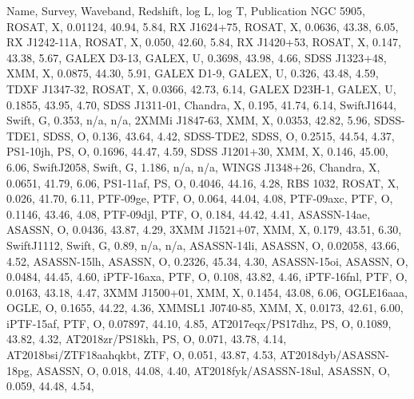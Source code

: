 Name, Survey, Waveband, Redshift, log L, log T, Publication
NGC 5905, ROSAT, X, 0.01124, 40.94, 5.84, \cite{Bade1996}
RX J1624+75, ROSAT, X, 0.0636, 43.38, 6.05, \cite{Grupe1999}
RX J1242-11A, ROSAT, X, 0.050, 42.60, 5.84, \cite{Komossa1999}
RX J1420+53, ROSAT, X, 0.147, 43.38, 5.67, \cite{Greiner2000}
GALEX D3-13, GALEX, U, 0.3698, 43.98, 4.66, \cite{Gezari2006}
SDSS J1323+48, XMM, X, 0.0875, 44.30, 5.91, \cite{Esquej2007}
GALEX D1-9, GALEX, U, 0.326, 43.48, 4.59, \cite{Gezari2008}
TDXF J1347-32, ROSAT, X, 0.0366, 42.73, 6.14, \cite{Cappelluti2009}
GALEX D23H-1, GALEX, U, 0.1855, 43.95, 4.70, \cite{Gezari2009}
SDSS J1311-01, Chandra, X, 0.195, 41.74, 6.14, \cite{Maksym2010}
SwiftJ1644, Swift, G, 0.353,   n/a, n/a, \cite{Bloom2011}
2XMMi J1847-63, XMM, X, 0.0353, 42.82, 5.96, \cite{Lin2011}
SDSS-TDE1, SDSS, O, 0.136, 43.64, 4.42, \cite{vanVelzen2011}
SDSS-TDE2, SDSS, O,      0.2515, 44.54, 4.37, \cite{vanVelzen2011}
PS1-10jh, PS, O,      0.1696, 44.47, 4.59, \cite{Gezari2012}
SDSS J1201+30, XMM, X, 0.146, 45.00, 6.06, \cite{Saxton2012}
SwiftJ2058, Swift, G, 1.186,   n/a, n/a, \cite{Cenko2012}
WINGS J1348+26, Chandra, X, 0.0651, 41.79, 6.06, \cite{Maksym2013}
PS1-11af, PS, O,      0.4046, 44.16, 4.28, \cite{Chornock2014}
RBS 1032, ROSAT, X, 0.026, 41.70, 6.11, \cite{Maksym2014}
PTF-09ge, PTF, O,     0.064, 44.04, 4.08, \cite{Arcavi2014}
PTF-09axc, PTF, O,      0.1146, 43.46, 4.08, \cite{Arcavi2014}
PTF-09djl, PTF, O,      0.184, 44.42, 4.41, \cite{Arcavi2014}
ASASSN-14ae, ASASSN, O,     0.0436, 43.87, 4.29, \cite{Holoien2014}
3XMM J1521+07, XMM, X, 0.179, 43.51, 6.30, \cite{Lin2015}
SwiftJ1112, Swift, G, 0.89,   n/a, n/a, \cite{Brown2015}
ASASSN-14li, ASASSN, O,     0.02058, 43.66, 4.52, \cite{Holoien2016}
ASASSN-15lh, ASASSN, O, 0.2326, 45.34, 4.30, \cite{Dong2016}
ASASSN-15oi, ASASSN, O,       0.0484, 44.45, 4.60, \cite{Holoien2016}
iPTF-16axa, PTF, O,      0.108, 43.82, 4.46, \cite{Hung2017}
iPTF-16fnl, PTF, O,     0.0163, 43.18, 4.47, \cite{Blagorodnova2017}
3XMM J1500+01, XMM, X, 0.1454, 43.08, 6.06, \cite{Lin2017}
OGLE16aaa, OGLE, O,      0.1655, 44.22, 4.36, \cite{Wyrzykowski2017}
XMMSL1 J0740-85, XMM, X, 0.0173, 42.61, 6.00, \cite{Saxton2017}
iPTF-15af, PTF, O,     0.07897, 44.10, 4.85, \cite{Blagorodnova2019}
AT2017eqx/PS17dhz, PS, O,      0.1089, 43.82, 4.32, \cite{Nicholl2019}
AT2018zr/PS18kh, PS, O,     0.071, 43.78, 4.14, \cite{vanVelzen2020}
AT2018bsi/ZTF18aahqkbt, ZTF, O,     0.051, 43.87, 4.53, \cite{vanVelzen2020}
AT2018dyb/ASASSN-18pg, ASASSN, O,     0.018, 44.08, 4.40, \cite{Leloudas2019}
AT2018fyk/ASASSN-18ul, ASASSN, O,     0.059, 44.48, 4.54, \cite{Wevers2019}
